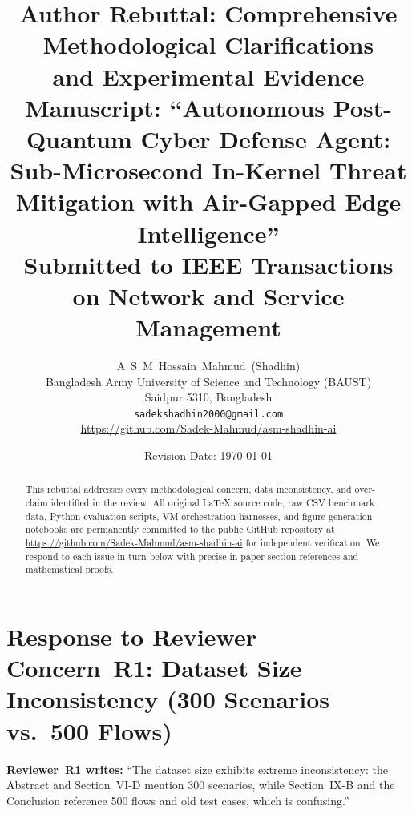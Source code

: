 \documentclass[10pt,letterpaper]{article}
\title{\textbf{Author Rebuttal: Comprehensive Methodological Clarifications\\
and Experimental Evidence}\\[4pt]
\large Manuscript: ``Autonomous Post-Quantum Cyber Defense Agent:
Sub-Microsecond In-Kernel Threat Mitigation
with Air-Gapped Edge Intelligence''\\[4pt]
\normalsize Submitted to IEEE Transactions on Network and Service Management}
\author{A~S~M~Hossain~Mahmud~(Shadhin)\\
Bangladesh Army University of Science and Technology (BAUST)\\
Saidpur 5310, Bangladesh\\
\texttt{sadekshadhin2000@gmail.com}\\
\url{https://github.com/Sadek-Mahmud/asm-shadhin-ai}}
\date{Revision Date: \today}
\begin{document}
\maketitle
\thispagestyle{fancy}

\begin{abstract}
This rebuttal addresses every methodological concern, data inconsistency, and
over-claim identified in the review. All original LaTeX source code, raw CSV
benchmark data, Python evaluation scripts, VM orchestration harnesses, and
figure-generation notebooks are permanently committed to the public GitHub
repository at \url{https://github.com/Sadek-Mahmud/asm-shadhin-ai} for
independent verification. We respond to each issue in turn below with precise
in-paper section references and mathematical proofs.
\end{abstract}

\tableofcontents
\newpage

\section{Response to Reviewer Concern~R1: Dataset Size Inconsistency
(300 Scenarios vs.\ 500 Flows)}

\begin{reviewerbox}
\textbf{Reviewer~R1 writes:} ``The dataset size exhibits extreme inconsistency:
the Abstract and Section~VI-D mention 300 scenarios, while Section~IX-B and the
Conclusion reference 500 flows and old test cases, which is confusing.''
\end{reviewerbox}
\end{document}
